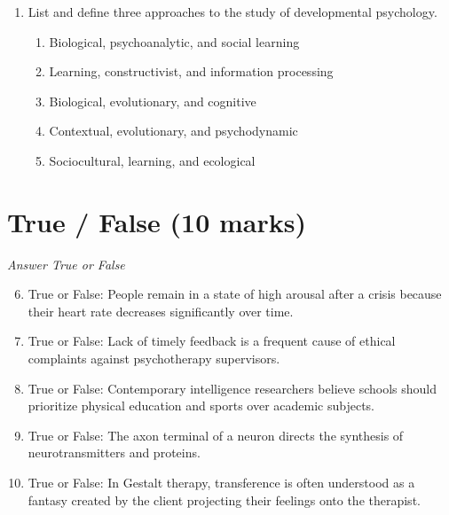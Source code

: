 \documentclass[12pt]{article}
\begin{document}
\begin{enumerate}[label=\arabic*.]
\begin{enumerate}[label=(\alph*)]
    \item fixation
    \item projection
    \item symptom
    \item regression
    \item denial
\end{enumerate}
\item List and define three approaches to the study of developmental psychology.
\begin{enumerate}[label=(\alph*)]
    \item Biological, psychoanalytic, and social learning
    \item Learning, constructivist, and information processing
    \item Biological, evolutionary, and cognitive
    \item Contextual, evolutionary, and psychodynamic
    \item Sociocultural, learning, and ecological
\end{enumerate}
\end{enumerate}

\section*{True / False (10 marks)}
\textit{Answer True or False}
\begin{enumerate}[label=\arabic*.]
\setcounter{enumi}{5}
\item True or False: People remain in a state of high arousal after a crisis because their heart rate decreases significantly over time.
\item True or False: Lack of timely feedback is a frequent cause of ethical complaints against psychotherapy supervisors.
\item True or False: Contemporary intelligence researchers believe schools should prioritize physical education and sports over academic subjects.
\item True or False: The axon terminal of a neuron directs the synthesis of neurotransmitters and proteins.
\item True or False: In Gestalt therapy, transference is often understood as a fantasy created by the client projecting their feelings onto the therapist.
\end{enumerate}
\end{document}
